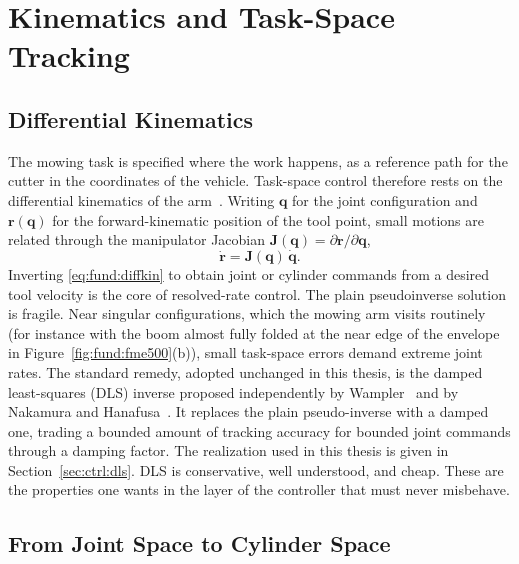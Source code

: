 \section{Kinematics and Task-Space Tracking}
\label{sec:fund:kinematics}

\subsection{Differential Kinematics}

The mowing task is specified where the work happens, as a reference path
for the cutter in the coordinates of the vehicle. Task-space control
therefore rests on the differential kinematics of the
arm~\cite{siciliano2009robotics}. Writing $\bm{q}$ for the joint
configuration and $\bm{r}(\bm{q})$ for the forward-kinematic position of
the tool point, small motions are related through the manipulator
Jacobian $\bm{J}(\bm{q}) = \partial \bm{r} / \partial \bm{q}$,
%
\begin{equation}
  \label{eq:fund:diffkin}
  \dot{\bm{r}} = \bm{J}(\bm{q})\, \dot{\bm{q}} .
\end{equation}
%
Inverting \eqref{eq:fund:diffkin} to obtain joint or cylinder commands
from a desired tool velocity is the core of resolved-rate control. The
plain pseudoinverse solution is fragile. Near singular configurations,
which the mowing arm visits routinely (for instance with the boom almost
fully folded at the near edge of the envelope in
Figure~\ref{fig:fund:fme500}(b)), small task-space errors demand extreme
joint rates. The standard remedy, adopted unchanged in this thesis, is
the damped least-squares (DLS) inverse proposed independently by
Wampler~\cite{wampler1986manipulator} and by Nakamura and
Hanafusa~\cite{nakamura1986inverse}. It replaces the plain pseudo-inverse
with a damped one, trading a bounded amount of tracking accuracy for bounded
joint commands through a damping factor. The realization used in this thesis
is given in Section~\ref{sec:ctrl:dls}. DLS is conservative, well
understood, and cheap. These are the properties one wants in the layer of
the controller that must never misbehave.

\subsection{From Joint Space to Cylinder Space}

